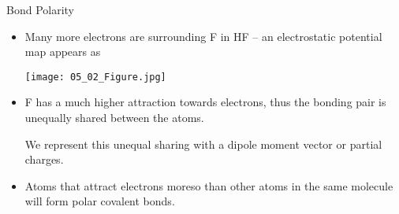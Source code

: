 \documentclass[notes=onlyslideswithnotes,notes=hide]{beamer}
\begin{document}
\begin{frame}{Bond Polarity}
	\begin{itemize}[<+->]
		\item Many more electrons are surrounding F in HF -- an
			\alert{electrostatic potential map} appears as
			\begin{center}
				\texttt{[image: 05\_02\_Figure.jpg]}
			\end{center}
		\item F has a much higher attraction towards electrons, thus the
			bonding pair is \alert{unequally shared} between the
			atoms.

			\medskip

			\begin{center}
			\end{center}

			\medskip

			We represent this unequal sharing with a \alert{dipole
			moment vector} or \alert{partial charges}.
		\item Atoms that attract electrons moreso than other atoms in
			the same molecule will form \alert{polar covalent bonds}.
	\end{itemize}
\end{frame}

%
%
%
%
%
%
%	
%
\end{document}
